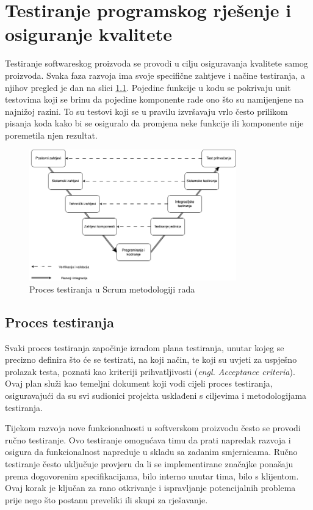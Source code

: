 \chapter{Testiranje programskog rješenje i osiguranje kvalitete}\label{uvodQA}

Testiranje softwareskog proizvoda se provodi u cilju osiguravanja kvalitete samog proizvoda.
Svaka faza razvoja ima svoje specifične zahtjeve i načine testiranja, a njihov pregled je dan na slici \ref{img:testingInScrum}.
Pojedine funkcije u kodu se pokrivaju unit testovima koji se brinu da pojedine komponente rade ono što su namijenjene na najnižoj razini. To su testovi koji se u pravilu izvršavaju vrlo često prilikom pisanja koda kako bi se osiguralo da promjena neke funkcije ili komponente nije poremetila njen rezultat.


\begin{figure}[!h]\begin{center}
\includegraphics[width=0.8\textwidth]{"img/testPhasesScrum"}
\caption{Proces testiranja u Scrum metodologiji rada}\label{img:testingInScrum}
\end{center}\end{figure}

\section{Proces testiranja}
Svaki proces testiranja započinje izradom plana testiranja, unutar kojeg se precizno definira što će se testirati, na koji način, te koji su uvjeti za uspješno prolazak testa, poznati kao kriteriji prihvatljivosti (\textit{engl. Acceptance criteria}).
Ovaj plan služi kao temeljni dokument koji vodi cijeli proces testiranja, osiguravajući da su svi sudionici projekta usklađeni s ciljevima i metodologijama testiranja.

Tijekom razvoja nove funkcionalnosti u softverskom proizvodu često se provodi ručno testiranje.
Ovo testiranje omogućava timu da prati napredak razvoja i osigura da funkcionalnost napreduje u skladu sa zadanim smjernicama.
Ručno testiranje često uključuje provjeru da li se implementirane značajke ponašaju prema dogovorenim specifikacijama, bilo interno unutar tima, bilo s klijentom.
Ovaj korak je ključan za rano otkrivanje i ispravljanje potencijalnih problema prije nego što postanu preveliki ili skupi za rješavanje.

